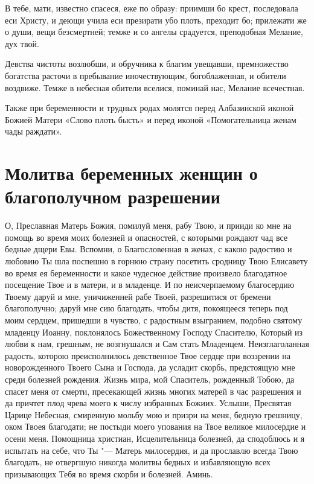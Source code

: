 

В тебе, мати, известно спасеся, еже по образу: приимши бо крест, последовала еси Христу, и деющи учила еси презирати убо плоть, преходит бо; прилежати же о души, вещи безсмертней; темже и со ангелы срадуется, преподобная Мелание, дух твой.




Девства чистоты возлюбши, и обручника к благим увещавши, премножество богатства расточи в пребывание иночествующим, богоблаженная, и обители воздвиже. Темже в небесная обители вселися, поминай нас, Мелание всечестная.

Также при беременности и трудных родах молятся перед Албазинской иконой Божией Матери «Слово плоть бысть» и перед иконой «Помогательница женам чады раждати».

\section{Молитва беременных женщин о благополучном разрешении}
 


О, Преславная Матерь Божия, помилуй меня, рабу Твою, и прииди ко мне на помощь во время моих болезней и опасностей, с которыми рождают чад все бедные дщери Евы. Вспомни, о Благословенная в женах, с какою радостию и любовию Ты шла поспешно в горнюю страну посетить сродницу Твою Елисавету во время ея беременности и какое чудесное действие произвело благодатное посещение Твое и в матери, и в младенце. И по неисчерпаемому благосердию Твоему даруй и мне, уничиженней рабе Твоей, разрешитися от бремени благополучно; даруй мне сию благодать, чтобы дитя, покоящееся теперь под моим сердцем, пришедши в чувство, с радостным взыгранием, подобно святому младенцу Иоанну, поклонялось Божественному Господу Спасителю, Который из любви к нам, грешным, не возгнушался и Сам стать Младенцем. Неизглаголанная радость, которою преисполнилось девственное Твое сердце при воззрении на новорожденного Твоего Сына и Господа, да усладит скорбь, предстоящую мне среди болезней рождения. Жизнь мира, мой Спаситель, рожденный Тобою, да спасет меня от смерти, пресекающей жизнь многих матерей в час разрешения и да причтет плод чрева моего к числу избранных Божиих. Услыши, Пресвятая Царице Небесная, смиренную мольбу мою и призри на меня, бедную грешницу, оком Твоея благодати; не постыди моего упования на Твое великое милосердие и осени меня. Помощница христиан, Исцелительница болезней, да сподоблюсь и я испытать на себе, что Ты "--- Матерь милосердия, и да прославлю всегда Твою благодать, не отвергшую никогда молитвы бедных и избавляющую всех призывающих Тебя во время скорби и болезней. Аминь. 


